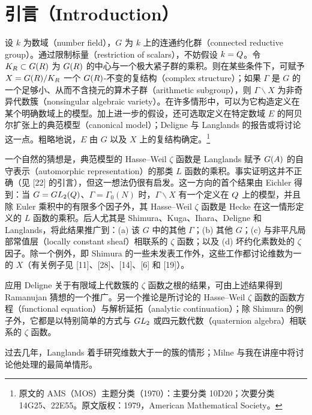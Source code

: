 
\section*{引言（Introduction）}
设 $k$ 为数域（number field），$G$ 为 $k$ 上的连通约化群（connected reductive group）。通过限制标量（restriction of scalars），不妨假设 $k=Q$。令 $K_R\subset G(R)$ 为 $G(R)$ 的中心与一个极大紧子群的乘积。则在某些条件下，可赋予 $X=G(R)/K_R$ 一个 $G(R)$-不变的复结构（complex structure）；如果 $\Gamma$ 是 $G$ 的一个足够小、从而不含挠元的算术子群（arithmetic subgroup），则 $\Gamma\backslash X$ 为非奇异代数簇（nonsingular algebraic variety）。在许多情形中，可以为它构造定义在某个明确数域上的模型。加上进一步的假设，还可选取定义在特定数域 $E$ 的阿贝尔扩张上的典范模型（canonical model）；Deligne 与 Langlands 的报告或将讨论这一点。粗略地说，$E$ 由 $G$ 以及 $X$ 上的复结构确定。\footnote{原文的 AMS（MOS）主题分类（1970）：主要分类 10D20；次要分类 14G25、22E55。原文版权：1979，American Mathematical Society。}

一个自然的猜想是，典范模型的 Hasse--Weil $\zeta$ 函数是 Langlands 赋予 $G(A)$ 的自守表示（automorphic representation）的那类 $L$ 函数的乘积。事实证明这并不正确（见 [22] 的引言），但这一想法仍很有启发。这一方向的首个结果由 Eichler 得到：当 $G=GL_2(Q)$、$\Gamma=\Gamma_0(N)$ 时，$\Gamma\backslash X$ 有一个定义在 $Q$ 上的模型，并且除 Euler 乘积中的有限多个因子外，其 Hasse--Weil $\zeta$ 函数是 Hecke 在这一情形定义的 $L$ 函数的乘积。后人尤其是 Shimura、Kuga、Ihara、Deligne 和 Langlands，将此结果推广到：(a) 该 $G$ 中的其他 $\Gamma$；(b) 其他 $G$；(c) 与非平凡局部常值层（locally constant sheaf）相联系的 $\zeta$ 函数；以及 (d) 坏约化素数处的 $\zeta$ 因子。除一个例外，即 Shimura 的一些未发表工作外，这些工作都讨论维数为一的 $X$（有关例子见 [11]、[28]、[14]、[6] 和 [19]）。

应用 Deligne 关于有限域上代数簇的 $\zeta$ 函数之根的结果，可由上述结果得到 Ramanujan 猜想的一个推广。另一个推论是所讨论的 Hasse--Weil $\zeta$ 函数的函数方程（functional equation）与解析延拓（analytic continuation）；除 Shimura 的例子外，它都是以特别简单的方式与 $GL_2$ 或四元数代数（quaternion algebra）相联系的 $\zeta$ 函数。

过去几年，Langlands 着手研究维数大于一的簇的情形；Milne 与我在讲座中将讨论他处理的最简单情形。


